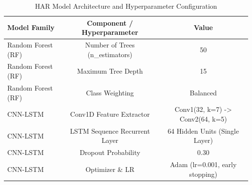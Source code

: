 \begin{table}[htbp]
\caption{HAR Model Architecture and Hyperparameter Configuration}
\label{tab:model_hyperparams}
\centering
\begin{tabular}{lcc}
\hline
Model Family & Component / Hyperparameter & Value \\ \hline
Random Forest (RF) & Number of Trees (n\_estimators) & 50 \\
Random Forest (RF) & Maximum Tree Depth & 15 \\
Random Forest (RF) & Class Weighting & Balanced \\
CNN-LSTM & Conv1D Feature Extractor & Conv1(32, k=7) -> Conv2(64, k=5) \\
CNN-LSTM & LSTM Sequence Recurrent Layer & 64 Hidden Units (Single Layer) \\
CNN-LSTM & Dropout Probability & 0.30 \\
CNN-LSTM & Optimizer \& LR & Adam (lr=0.001, early stopping) \\
\hline
\end{tabular}
\end{table}
